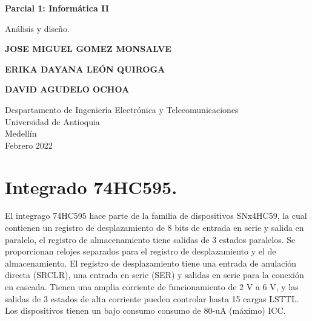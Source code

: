 \documentclass{article}
\begin{document}
\begin{titlepage}
    \begin{center}
        \vspace*{1cm}
            
        \Huge
        \textbf{Parcial 1: Informática II}
            
        \vspace{0.5cm}
        \LARGE
       Análisis y diseño.
          
            
        \vspace{6cm}
        
        \textbf{JOSE MIGUEL GOMEZ MONSALVE}
        
        \vspace{0.5cm}
        
        \textbf{ERIKA DAYANA LEÓN QUIROGA}
        
        \vspace{0.5cm}
        
        \textbf{DAVID AGUDELO OCHOA}
            

            
        \vfill
            
        \vspace{0.8cm}
       
        \Large


        \vfill
        Despartamento de Ingeniería Electrónica y Telecomunicaciones\\
        Universidad de Antioquia\\
        Medellín\\
        Febrero 2022
                 
    \end{center}
\end{titlepage}


\tableofcontents\newpage


\section{Integrado 74HC595.} \label{Integrado}
El integrago 74HC595 hace parte de la familia de dispositivos SNx4HC59, la cual contienen un registro de desplazamiento de 8 bits de entrada en serie y salida en paralelo, el registro de almacenamiento tiene salidas de 3 estados paralelos. Se proporcionan relojes separados para el registro de desplazamiento y el de almacenamiento. El registro de desplazamiento tiene una entrada de anulación directa (SRCLR), una entrada en serie (SER) y salidas en serie para la conexión en cascada. Tienen una amplia corriente de funcionamiento de 2 V a 6 V, y las salidas de 3 estados de alta corriente pueden controlar hasta 15 cargas LSTTL. Los dispositivos tienen un bajo consumo consumo de 80-uA (máximo) ICC.
\end{document}

